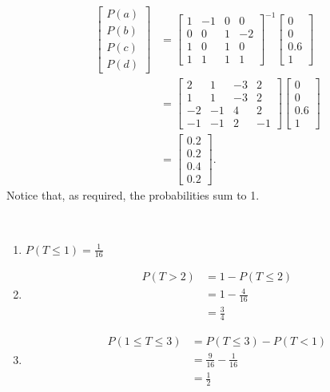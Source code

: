 \begin{problem}{17}
	\begin{align*}
 		 \begin{bmatrix}
			P(a)\\
			P(b)\\
			P(c)\\
			P(d)
		  \end{bmatrix}
		  & =
		  \begin{bmatrix}
			1 &-1&0&0\\
			0&0&1&-2 \\
			1&0&1&0 \\
			1&1&1&1
		  \end{bmatrix}^{-1}
		  \begin{bmatrix}
			0 \\
			0 \\
			0.6 \\
			1
		  \end{bmatrix} \\
		  & =  \begin{bmatrix}
			2 &1&-3&2\\
			1&1&-3&2 \\
			-2&-1&4&2 \\
			-1&-1&2&-1
		  \end{bmatrix}
		  \begin{bmatrix}
			0 \\
			0 \\
			0.6 \\
			1
		  \end{bmatrix}\\
		  &=
		  \begin{bmatrix}
			0.2 \\
			0.2 \\
			0.4 \\
			0.2
		  \end{bmatrix}.
	\end{align*}
Notice that, as required, the probabilities sum to 1.

\end{problem} 

\begin{problem}{18} $ $
	\begin{enumerate}
		\item $P(T \le 1) = \frac{1}{16}$
		
		\item 
			\begin{align*}
				P(T>2) &= 1 - P(T\le 2) \\
				&= 1-\frac{4}{16} \\
				&=\frac{3}{4}
			\end{align*}
			
		\item
			\begin{align*}
				P(1\le T \le 3) &= P(T \le 3) - P(T < 1) \\
				&= \frac{9}{16}-\frac{1}{16} \\
				&=\frac{1}{2}
			\end{align*}
			
  
 	\end{enumerate}
\end{problem} 

